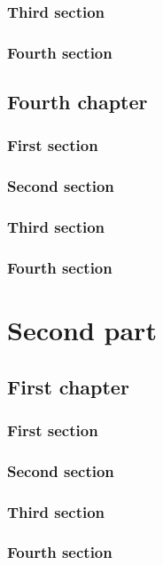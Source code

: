 \documentclass{researchbook}
\begin{document}
\section{Third section}\lipsum
\section{Fourth section}\lipsum


\chapter{Fourth chapter}

\section{First section}\lipsum
\section{Second section}\lipsum
\section{Third section}\lipsum
\section{Fourth section}\lipsum


\part{Second part}
\chapter{First chapter}

\section{First section}\lipsum
\section{Second section}\lipsum
\section{Third section}\lipsum
\section{Fourth section}\lipsum
\end{document}
